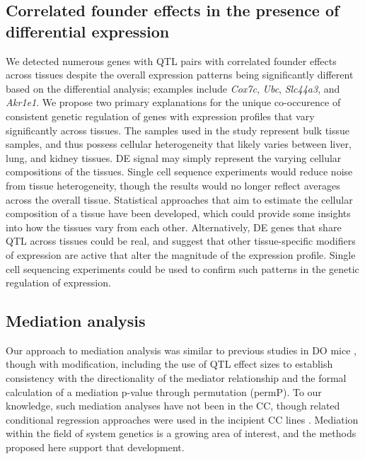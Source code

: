 \documentclass[9pt,twocolumn,twoside]{gsajnl}
\begin{document}
\subsection{Correlated founder effects in the presence of differential expression}

We detected numerous genes with QTL pairs with correlated founder effects across tissues despite the overall expression patterns being significantly different based on the differential analysis; examples include \textit{Cox7c}, \textit{Ubc}, \textit{Slc44a3}, and \textit{Akr1e1}. We propose two primary explanations for the unique co-occurence of consistent genetic regulation of genes with expression profiles that vary significantly across tissues. The samples used in the study represent bulk tissue samples, and thus possess cellular heterogeneity that likely varies between liver, lung, and kidney tissues. DE signal may simply represent the varying cellular compositions of the tissues. Single cell sequence experiments would reduce noise from tissue heterogeneity, though the results would no longer reflect averages across the overall tissue. Statistical approaches that aim to estimate the cellular composition of a tissue \citep{Aran2017} have been developed, which could provide some insights into how the tissues vary from each other. Alternatively, DE genes that share QTL across tissues could be real, and suggest that other tissue-specific modifiers of expression are active that alter the magnitude of the expression profile. Single cell sequencing experiments could be used to confirm such patterns in the genetic regulation of expression.

\subsection{Mediation analysis}

Our approach to mediation analysis was similar to previous studies in DO mice \citep{Chick2016,Keller2018,Skelly2019}, though with modification, including the use of QTL effect sizes to establish consistency with the directionality of the mediator relationship and the formal calculation of a mediation p-value through permutation (permP).  To our knowledge, such mediation analyses have not been in the CC, though related conditional regression approaches were used in the incipient CC lines \citep{Rutledge2014, Kelada2014}. Mediation within the field of system genetics is a growing area of interest, and the methods proposed here support that development.
\end{document}
